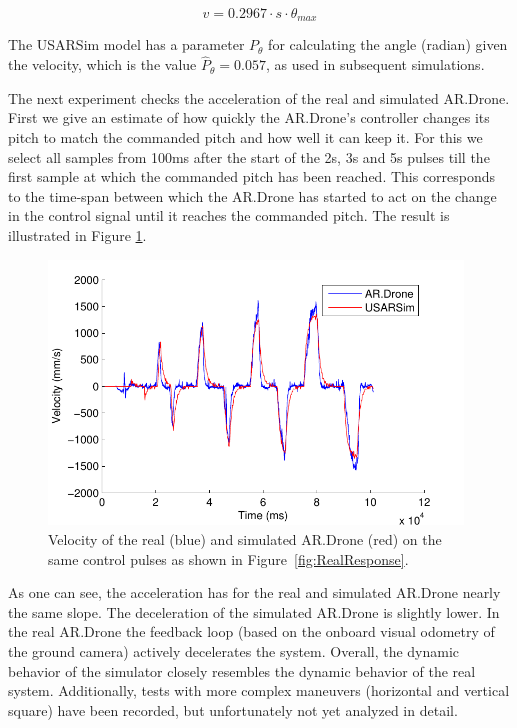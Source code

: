 \begin{equation}
v = 0.2967 \cdot s \cdot \theta_{max}
\label{eq:conversion}
\end{equation}

The USARSim model has a parameter $P_\theta$ for calculating the angle (radian) given the velocity, which
is the value $\hat{P}_\theta = 0.057$, as used in subsequent simulations.

The next experiment checks the acceleration of the real and simulated AR.Drone. First we give an estimate of how quickly the AR.Drone's controller changes its pitch to match the commanded pitch and how well it can keep it. For this we select all samples from 100ms after the start
of the 2s, 3s and 5s pulses till the first sample at which the commanded pitch has been reached. This
corresponds to the time-span between which the AR.Drone has started to act on the change in the control
signal until it reaches the commanded pitch. The result is illustrated in Figure \ref{fig:ComparisonOfResponse}.

\begin{figure}[htb]
\centering
\includegraphics[width=11cm]{images/RYtdB-eps-converted-to.pdf}
\caption{Velocity of the real (blue) and simulated AR.Drone (red) on the same control pulses as shown in Figure~\ref{fig:RealResponse}.}

\label{fig:ComparisonOfResponse}
\end{figure}

As one can see, the acceleration has for the real and simulated AR.Drone nearly the same slope. The deceleration of the simulated AR.Drone is slightly lower. In the real AR.Drone the feedback loop (based on the onboard visual odometry of the ground camera) actively decelerates the system. Overall, the dynamic behavior of the simulator closely resembles the dynamic behavior of the real system. Additionally, tests with more complex maneuvers (horizontal and vertical square) have been recorded, but unfortunately not yet analyzed in detail.


